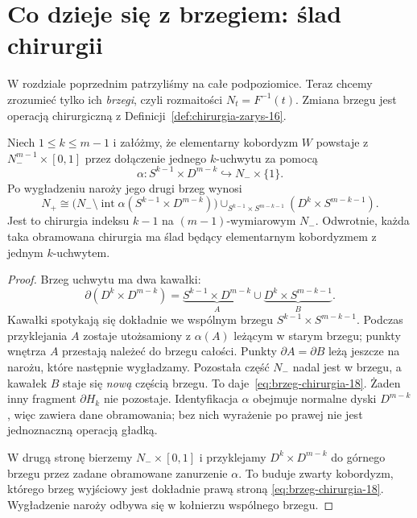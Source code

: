 \section{Co dzieje się z brzegiem: ślad chirurgii}
\label{sec:slad-chirurgii-18}

W rozdziale poprzednim patrzyliśmy na całe
podpoziomice. Teraz chcemy zrozumieć tylko
ich \emph{brzegi}, czyli rozmaitości $N_t=F^{-1}(t)$.
Zmiana brzegu jest operacją chirurgiczną
z Definicji~\ref{def:chirurgia-zarys-16}.

\begin{twierdzenie}
\label{thm:slad-chirurgii-18}
Niech $1\leq k\leq m-1$ i załóżmy, że
elementarny kobordyzm $W$ powstaje z
$N_-^{m-1}\times[0,1]$ przez dołączenie
jednego $k$-uchwytu za pomocą
\[
 \alpha:S^{k-1}\times D^{m-k}
       \hookrightarrow N_-\times\{1\}.
\]
Po wygładzeniu naroży jego drugi brzeg wynosi
\begin{equation}\label{eq:brzeg-chirurgia-18}
 N_+\cong
 \bigl(N_-\setminus\operatorname{int}
        \alpha(S^{k-1}\times D^{m-k})\bigr)
 \mathop{\cup}_{S^{k-1}\times S^{m-k-1}}
       (D^k\times S^{m-k-1}).
\end{equation}
Jest to chirurgia indeksu $k-1$ na
$(m-1)$-wymiarowym $N_-$.
Odwrotnie, każda taka obramowana chirurgia
ma ślad będący elementarnym kobordyzmem
z jednym $k$-uchwytem.
\end{twierdzenie}
\begin{proof}
Brzeg uchwytu ma dwa kawałki:
\[
 \partial(D^k\times D^{m-k})
 =\underbrace{S^{k-1}\times D^{m-k}}_{A}
   \cup
   \underbrace{D^k\times S^{m-k-1}}_{B}.
\]
Kawałki spotykają się dokładnie we wspólnym
brzegu $S^{k-1}\times S^{m-k-1}$.
Podczas przyklejania $A$ zostaje utożsamiony
z $\alpha(A)$ leżącym w starym brzegu;
punkty wnętrza $A$ przestają należeć do brzegu całości.
Punkty $\partial A=\partial B$ leżą jeszcze na narożu,
które następnie wygładzamy.
Pozostała część $N_-$ nadal jest w brzegu,
a kawałek $B$ staje się \emph{nową} częścią
brzegu. To daje~\eqref{eq:brzeg-chirurgia-18}.
Żaden inny fragment $\partial H_k$ nie pozostaje.
Identyfikacja $\alpha$ obejmuje normalne dyski
$D^{m-k}$, więc zawiera dane obramowania;
bez nich wyrażenie po prawej nie jest
jednoznaczną operacją gładką.

W drugą stronę bierzemy $N_-\times[0,1]$
i przyklejamy $D^k\times D^{m-k}$ do górnego
brzegu przez zadane obramowane zanurzenie
$\alpha$. To buduje zwarty kobordyzm, którego
brzeg wyjściowy jest dokładnie prawą stroną
\eqref{eq:brzeg-chirurgia-18}. Wygładzenie
naroży odbywa się w kołnierzu wspólnego brzegu.
\end{proof}

